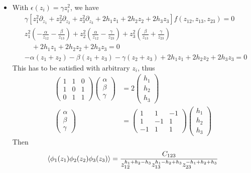 \begin{enumerate}
\begin{itemize}
		\item With $\epsilon(z_i) = \gamma z_i^2$, we have
			\begin{align*}
				&\gamma \left[ z_1^2 \partial_{z_1} + z_2^2 \partial_{z_2} + z_3^2 \partial_{z_3} + 2h_1z_1 + 2h_2 z_2 + 2h_3 z_3 \right] f(z_{12}, z_{13}, z_{23}) = 0 \\
				&z_1^2 \left( - \frac{\alpha}{z_{12}} - \frac{\beta }{z_{13}} \right) + z_2^2 \left( \frac{\alpha}{z_{12}} - \frac{\gamma}{z_{23}} \right) + z_3^2 \left( \frac{\beta}{z_{13}} + \frac{\gamma}{z_{23}} \right)\\
				&\quad  + 2h_1z_1 + 2h_2z_2 + 2h_3z_3  = 0 \\
				& -\alpha (z_1 + z_2) - \beta (z_1 + z_3) - \gamma (z_2 + z_3)  + 2h_1 z_1 + 2h_2 z_2 + 2h_3 z_3 = 0
			\end{align*}
			This has to be satisfied with arbitrary $z_i$, thus
			\begin{align*}
				\begin{pmatrix} 1 & 1 & 0 \\ 1 & 0 & 1 \\ 0 & 1 & 1\end{pmatrix} \begin{pmatrix} \alpha \\ \beta \\ \gamma \end{pmatrix} &= 2 \begin{pmatrix} h_1 \\ h_2 \\ h_3 \end{pmatrix} \\
				\begin{pmatrix} \alpha \\ \beta \\ \gamma \end{pmatrix} &= \begin{pmatrix} 1 & 1 & -1 \\ 1 & -1 & 1 \\ -1 & 1 & 1 \end{pmatrix} \begin{pmatrix} h_1 \\ h_2 \\ h_3 \end{pmatrix}
			\end{align*}
			Then
			\begin{equation}
				\expval{\phi_1 (z_1) \phi_2(z_2) \phi_3(z_3)}  = \frac{C_{123}}{z_{12}^{h_1 + h_2 - h_3} z_{13}^{h_1 - h_2 + h_3} z_{23}^{-h_1 + h_2 + h_3}}			
			\end{equation}
	\end{itemize}
\end{enumerate}

